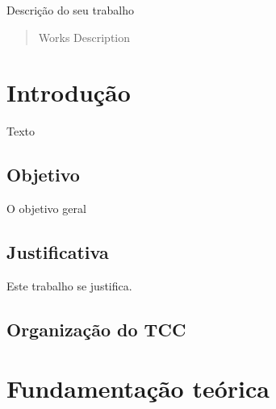 \documentclass[eso]{bcc}
\begin{document}


\capa %


\begin{resumo}
Descrição do seu trabalho
\end{resumo}

\begin{abstract}
Works Description
\end{abstract}

\renewcommand\contentsname{\centerline{Sumário}}
\renewcommand\listfigurename{\centerline{Lista de Figuras}}
\renewcommand\listtablename{\centerline{Lista de Tabelas}}

\tableofcontents

\listoffigures
{}

\listoftables
{}

\inicio
\chapter{Introdução}

Texto

\section {Objetivo}

O objetivo geral


\section{Justificativa}

Este trabalho se justifica.

\section{Organização do TCC}


\chapter{Fundamentação teórica}
\label{chap:fundamentacao}
\end{document}
